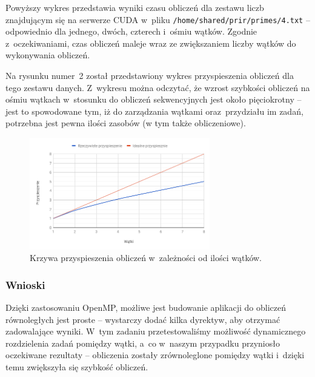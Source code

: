 \documentclass[a4paper,12pt]{article}
\begin{document}
Powyższy wykres przedstawia wyniki czasu obliczeń dla zestawu liczb znajdującym się na serwerze CUDA w~pliku \texttt{/home/shared/prir/primes/4.txt} -- odpowiednio dla jednego, dwóch, czterech i~ośmiu wątków. Zgodnie z~oczekiwaniami, czas obliczeń maleje wraz ze zwiększaniem liczby wątków do wykonywania obliczeń.

Na rysunku numer~2 został przedstawiony wykres przyspieszenia obliczeń dla tego zestawu danych. Z~wykresu można odczytać, że wzrost szybkości obliczeń na ośmiu wątkach w~stosunku do obliczeń sekwencyjnych jest około pięciokrotny -- jest to spowodowane tym, iż do zarządzania wątkami oraz~przydziału im zadań, potrzebna jest pewna ilości zasobów (w tym także obliczeniowe).

\begin{figure}[!htbp]
  \centering
    \includegraphics[width=0.7\textwidth]{chart2}
    \caption{Krzywa przyspieszenia obliczeń w~zależności od ilości wątków.}
  \label{chart-acceleration}
\end{figure}

\subsubsection*{Wnioski}
Dzięki zastosowaniu OpenMP, możliwe jest budowanie aplikacji do obliczeń równoległych jest proste -- wystarczy dodać kilka dyrektyw, aby otrzymać zadowalające wyniki. W~tym zadaniu przetestowaliśmy możliwość dynamicznego rozdzielenia zadań pomiędzy wątki, a~co w~naszym przypadku przyniosło oczekiwane rezultaty -- obliczenia zostały zrównoleglone pomiędzy wątki i~dzięki temu zwiększyła się szybkość obliczeń.
\end{document}

